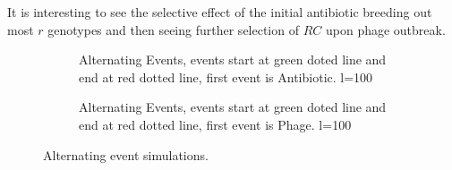 \FloatBarrier
It is interesting to see the selective effect of the initial antibiotic breeding out most $r$ genotypes and then seeing further selection of $RC$ upon phage outbreak.
\FloatBarrier
\FloatBarrier
\begin{figure}[htb!]
    \centering
    \begin{subfigure}[t]{0.45\textwidth}
        \centering
    \caption{Alternating Events, events start at green doted line and end at red dotted line, first event is Antibiotic. l=100}
    \end{subfigure}
    \begin{subfigure}[t]{0.45\textwidth}
        \centering
    \caption{Alternating Events, events start at green doted line and end at red dotted line, first event is Phage. l=100}
    \end{subfigure}
    \caption{Alternating event simulations.}
\end{figure}
